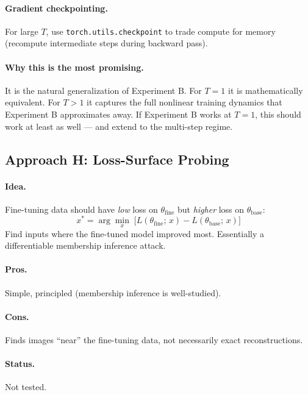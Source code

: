 \documentclass[11pt,a4paper]{article}
\begin{document}
\paragraph{Gradient checkpointing.} For large $T$, use \texttt{torch.utils.checkpoint} to trade compute for memory (recompute intermediate steps during backward pass).

\paragraph{Why this is the most promising.} It is the natural generalization of Experiment B. For $T{=}1$ it is mathematically equivalent. For $T>1$ it captures the full nonlinear training dynamics that Experiment B approximates away. If Experiment B works at $T{=}1$, this should work at least as well — and extend to the multi-step regime.

\subsection{Approach H: Loss-Surface Probing}

\paragraph{Idea.} Fine-tuning data should have \emph{low} loss on $\theta_{\mathrm{fine}}$ but \emph{higher} loss on $\theta_{\mathrm{base}}$:
\[
  x^* = \arg\min_x \;\bigl[L(\theta_{\mathrm{fine}};\, x) - L(\theta_{\mathrm{base}};\, x)\bigr]
\]
Find inputs where the fine-tuned model improved most. Essentially a differentiable membership inference attack.

\paragraph{Pros.} Simple, principled (membership inference is well-studied).

\paragraph{Cons.} Finds images ``near'' the fine-tuning data, not necessarily exact reconstructions.

\paragraph{Status.} \colorbox{yellow!30}{Not tested.}

\end{document}
